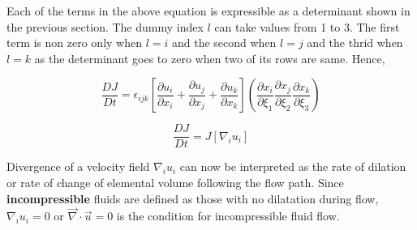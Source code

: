 Each of the terms in the above equation is expressible as a determinant shown in the previous section. The dummy index $l$ can take values from 1 to 3. The first term is non zero only when $l=i$ and the second when $l=j$ and the thrid when $l=k$ as the determinant goes to zero when two of its rows are same. Hence,

$$ \frac{DJ}{Dt} = \epsilon_{ijk} \left[
\frac{\partial u_i}{\partial x_i} +
\frac{\partial u_j}{\partial x_j} +
\frac{\partial u_k}{\partial x_k} \right]
\left(
\frac{\partial x_i}{\partial \xi_1} 
\frac{\partial x_j}{\partial \xi_2} 
\frac{\partial x_k}{\partial \xi_3} \right)
$$

$$ \frac{DJ}{Dt} = J \left[ \nabla_i u_i \right] $$

Divergence of a velocity field $\nabla_i u_i$ can now be interpreted as the rate of dilation or rate of change of elemental volume following the flow path. Since {\bf incompressible} fluids are defined as those with no dilatation during flow, $\nabla_i u_i = 0$ or $\vec{\nabla} \cdot \vec{u} = 0$ is the condition for incompressible fluid flow.


